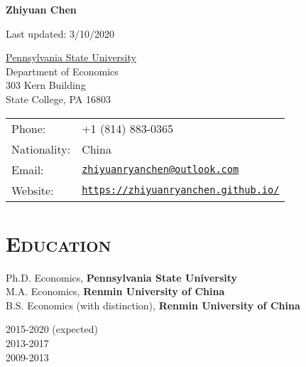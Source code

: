 \documentclass[letterpaper]{article}
\def\name{Zhiyuan Chen}
\begin{document}

\centerline{\huge \bf \name}

\vspace{1ex}

\normalsize


\begin{center}
{\scriptsize Last updated: 3/10/2020}
\end{center}

\vspace{0.25in}

\begin{minipage}{0.5\linewidth}
  \href{http://www.econ.psu.edu/}{Pennsylvania State University} \\
  Department of Economics \\
  303 Kern Building \\
  State College, PA 16803
\end{minipage}
\begin{minipage}{0.5\linewidth}
  \begin{tabular}{ll}
    Phone: & +1 (814) 883-0365 \\
    Nationality: &  China \\
    Email: & \href{mailto:zhiyuanryanchen@outlook.com}{\tt zhiyuanryanchen@outlook.com} \\
    Website: & \href{https://zhiyuanryanchen.github.io/}{\tt https://zhiyuanryanchen.github.io/} \\
  \end{tabular}
\end{minipage}




\section*{\textsc{Education}}
\begin{minipage}{0.7\textwidth}
 Ph.D. Economics, \textbf{Pennsylvania State University}\\
  M.A.  Economics, \textbf{Renmin University of China}  \\
 B.S.  Economics (with distinction), \textbf{Renmin University of China}
\end{minipage}
\begin{minipage}{0.3\textwidth}
   2015-2020 (expected)  \\
   2013-2017   \\
    2009-2013
\end{minipage}
\end{document}
